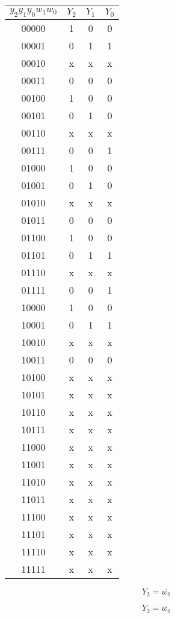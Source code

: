 \documentclass[10pt,a4paper]{article}
\begin{document}
\begin{multicols}{2}

\begin{tabular}{c|c|c|c}
$y_2y_1y_0w_1w_0$ & $Y_2$ & $Y_1$ & $Y_0$ \\ 
\hline 
00000 & 1 & 0 & 0 \\ 
\hline 
00001 & 0 & 1 & 1 \\ 
\hline 
00010 & x & x & x \\ 
\hline 
00011 & 0 & 0 & 0 \\ 
\hline 
00100 & 1 & 0 & 0 \\ 
\hline 
00101 & 0 & 1 & 0 \\ 
\hline 
00110 & x & x & x \\ 
\hline 
00111 & 0 & 0 & 1 \\ 
\hline 
01000 & 1 & 0 & 0 \\ 
\hline 
01001 & 0 & 1 & 0 \\ 
\hline 
01010 & x & x & x \\ 
\hline 
01011 & 0 & 0 & 0 \\ 
\hline 
01100 & 1 & 0 & 0 \\ 
\hline 
01101 & 0 & 1 & 1 \\ 
\hline 
01110 & x & x & x \\ 
\hline 
01111 & 0 & 0 & 1 \\ 
\hline 
10000 & 1 & 0 & 0 \\ 
\hline 
10001 & 0 & 1 & 1 \\ 
\hline 
10010 & x & x & x \\ 
\hline 
10011 & 0 & 0 & 0 \\ 
\hline 
10100 & x & x & x \\ 
\hline 
10101 & x & x & x \\ 
\hline 
10110 & x & x & x \\ 
\hline 
10111 & x & x & x \\ 
\hline 
11000 & x & x & x \\ 
\hline 
11001 & x & x & x \\ 
\hline 
11010 & x & x & x \\ 
\hline 
11011 & x & x & x \\ 
\hline 
11100 & x & x & x \\ 
\hline 
11101 & x & x & x \\ 
\hline 
11110 & x & x & x \\ 
\hline 
11111 & x & x & x \\ 
\end{tabular} 

\[
Y_2 = \overline{w_0}
\]

\[
Y_2 = \overline{w_0}
\]
\end{multicols}
\end{document}
